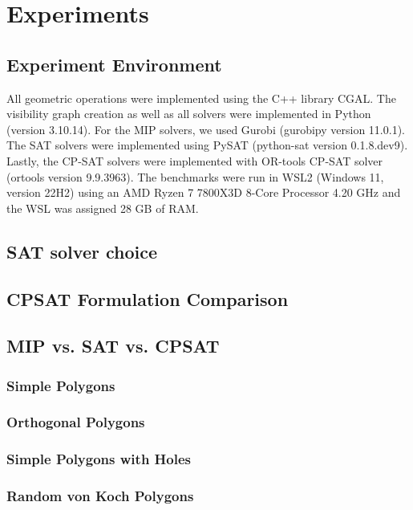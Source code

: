 \chapter{Experiments}
\section{Experiment Environment}
All geometric operations were implemented using the C++ library CGAL. The visibility graph creation as well as all solvers were implemented in Python (version 3.10.14). For the MIP solvers, we used Gurobi (gurobipy version 11.0.1). The SAT solvers were implemented using PySAT (python-sat version 0.1.8.dev9). Lastly, the CP-SAT solvers were implemented with OR-tools CP-SAT solver (ortools version 9.9.3963).
The benchmarks were run in WSL2 (Windows 11, version 22H2) using an AMD Ryzen 7 7800X3D 8-Core Processor 4.20 GHz and the WSL was assigned 28 GB of RAM.

\section{SAT solver choice}

\section{CPSAT Formulation Comparison}

\section{MIP vs. SAT vs. CPSAT}

\subsection{Simple Polygons}

\subsection{Orthogonal Polygons}

\subsection{Simple Polygons with Holes}

\subsection{Random von Koch Polygons}
